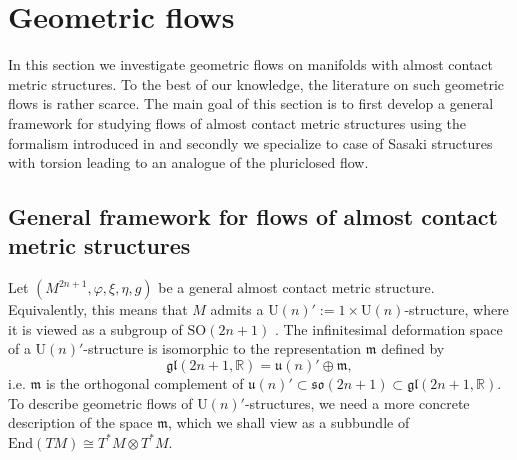 \documentclass{article}
\theoremstyle{definition}
\newcommand{\R}{\mathbb{R}}
\numberwithin{equation}{section}
\begin{document}
\section{Geometric flows}
In this section we investigate geometric flows on manifolds with almost contact metric structures. To the best of our knowledge, the literature on such geometric flows is rather scarce. The main goal of this section is to first develop a general framework for studying flows of almost contact metric structures using the formalism introduced in \cite{Fadel2022} and secondly we specialize to case of Sasaki structures with torsion leading to an analogue of the pluriclosed flow.

\subsection{General framework for flows of almost contact metric structures}

Let $(M^{2n+1},\varphi,\xi,\eta,g)$ be a general almost contact metric structure. Equivalently, this means that $M$ admits a $\mathrm{U}(n)':=1\times \mathrm{U}(n)$-structure, where it is viewed as a subgroup of $\mathrm{SO}(2n+1)$ \cite{Bl,CM}. The infinitesimal deformation space of a $\mathrm{U}(n)'$-structure is isomorphic to the representation $\mathfrak{m}$ defined by 
\begin{equation*}
\mathfrak{gl}(2n+1,\R)= \mathfrak{u}(n)'\oplus \mathfrak{m},    
\end{equation*}
i.e. $\mathfrak{m}$ is the orthogonal complement of $\mathfrak{u}(n)'\subset\mathfrak{so}(2n+1)\subset\mathfrak{gl}(2n+1,\R)$.
To describe geometric flows of $\mathrm{U}(n)'$-structures, we need a more concrete description of the space $\mathfrak{m}$, which we shall view as a subbundle of $\mathrm{End}(TM) \cong T^*M\otimes T^*M$.
\end{document}
